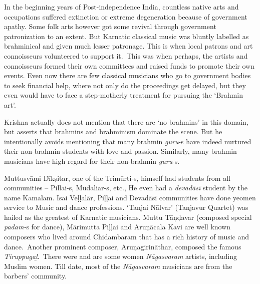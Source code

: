 In the beginning years of Post-independence India, countless native arts and occupations suffered extinction or extreme degeneration because of government apathy. Some folk arts however got some revival through government patronization to an extent. But Karnatic classical music was bluntly labelled as brahminical and given much lesser patronage. This is when local patrons and art connoisseurs volunteered to support it.~This was when perhaps, the artists and connoisseurs formed their own committees and raised funds to promote their own events. Even now there are few classical musicians who go to government bodies to seek financial help, where not only do the proceedings get delayed, but they even would have to face a step-motherly treatment for pursuing the ‘Brahmin art’.

Krishna actually does not mention that there are ‘no brahmins’ in this domain, but asserts that brahmins and brahminism dominate the scene. But he intentionally avoids mentioning that many brahmin \textit{guru}-s have indeed nurtured their non-brahmin students with love and passion. Similarly, many brahmin musicians have high regard for their non-brahmin \textit{guru}-s.

Muttusvāmi Dīkṣitar, one of the Trimūrti-s, himself had students from all communities – Pillai-s, Mudaliar-s, etc., He even had a \textit{devadāsī} student by the name Kamalam. Isai Veḷḷalār, Piḷḷai and Devadāsī communities have done yeomen service to Music and dance professions. ‘Tanjai Nālvar’ (Tanjavur Quartet) was hailed as the greatest of Karnatic musicians. Muttu Tāṇḍavar (composed special \textit{padam-}s for dance), Mārimutta Piḷḷai and Aruṇācala Kavi are well known composers who lived around Chidambaram that has a rich history of music and dance.~Another prominent composer, Aruṇagirināthar, composed the famous \textit{Tiruppugaḻ}.~There were and are some women \textit{Nāgasvaram} artists, including Muslim women. Till date, most of the \textit{Nāgasvaram} musicians are from the barbers’ community.

